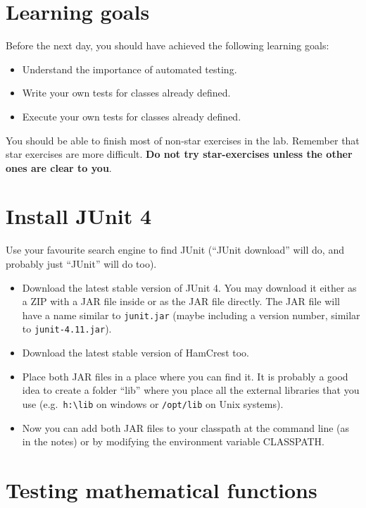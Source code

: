\documentclass{article}
\begin{document}
\section*{Learning goals}
\label{sec:learning-goals}

Before the next day, you should have achieved the following learning
goals: 

\begin{itemize}
\item Understand the importance of automated testing. 
\item Write your own tests for classes already defined. 
\item Execute your own tests for classes already defined. 
\end{itemize}

You should be able to finish most of non-star exercises in the lab. 
Remember that star exercises are more difficult. 
\textbf{Do not try star-exercises unless the other ones are clear to
  you}.  


\section{Install JUnit 4}
\label{sec:install-junit-4}

Use your favourite search engine to find JUnit (``JUnit download''
will do, and probably just ``JUnit'' will do too). 

\begin{itemize}
\item Download the latest stable version of JUnit 4. You may download
  it either as a ZIP with a JAR file inside or as the JAR file
  directly. The JAR file will have a name
  similar to \verb+junit.jar+ (maybe including a version number,
  similar to \verb+junit-4.11.jar+).
\item Download the latest stable version of HamCrest too. 
\item Place both JAR files in a place where you can find it. It is
  probably a good idea to create a folder ``lib'' where you place all
  the external libraries that you use (e.g.~\verb+h:\lib+ on windows
  or \verb+/opt/lib+ on Unix systems).
\item Now you can add both JAR files to your classpath at the command
  line (as in the notes) or by modifying the environment variable
  CLASSPATH. 
\end{itemize}

\section{Testing mathematical functions}
\label{sec:test-math-funct}
\end{document}

